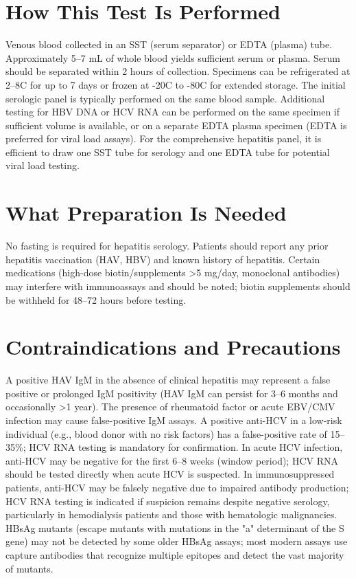 \section*{How This Test Is Performed}
Venous blood collected in an SST (serum separator) or EDTA (plasma) tube. Approximately 5--7 mL of whole blood yields sufficient serum or plasma. Serum should be separated within 2 hours of collection. Specimens can be refrigerated at 2--8\textdegree{}C for up to 7 days or frozen at -20\textdegree{}C to -80\textdegree{}C for extended storage. The initial serologic panel is typically performed on the same blood sample. Additional testing for HBV DNA or HCV RNA can be performed on the same specimen if sufficient volume is available, or on a separate EDTA plasma specimen (EDTA is preferred for viral load assays). For the comprehensive hepatitis panel, it is efficient to draw one SST tube for serology and one EDTA tube for potential viral load testing.

\section*{What Preparation Is Needed}
No fasting is required for hepatitis serology. Patients should report any prior hepatitis vaccination (HAV, HBV) and known history of hepatitis. Certain medications (high-dose biotin/supplements >5 mg/day, monoclonal antibodies) may interfere with immunoassays and should be noted; biotin supplements should be withheld for 48--72 hours before testing.

\section*{Contraindications and Precautions}
A positive HAV IgM in the absence of clinical hepatitis may represent a false positive or prolonged IgM positivity (HAV IgM can persist for 3--6 months and occasionally >1 year). The presence of rheumatoid factor or acute EBV/CMV infection may cause false-positive IgM assays. A positive anti-HCV in a low-risk individual (e.g., blood donor with no risk factors) has a false-positive rate of 15--35\%; HCV RNA testing is mandatory for confirmation. In acute HCV infection, anti-HCV may be negative for the first 6--8 weeks (window period); HCV RNA should be tested directly when acute HCV is suspected. In immunosuppressed patients, anti-HCV may be falsely negative due to impaired antibody production; HCV RNA testing is indicated if suspicion remains despite negative serology, particularly in hemodialysis patients and those with hematologic malignancies. HBsAg mutants (escape mutants with mutations in the "a" determinant of the S gene) may not be detected by some older HBsAg assays; most modern assays use capture antibodies that recognize multiple epitopes and detect the vast majority of mutants.

